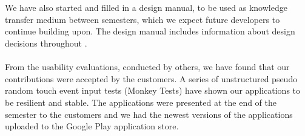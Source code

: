 \\\\
We have also started and filled in a design manual, to be used as knowledge transfer medium between semesters, which we expect future \giraf developers to continue building upon. The design manual includes information about design decisions throughout \giraf.  
\\\\
From the usability evaluations, conducted by others, we have found that our contributions were accepted by the customers. A series of unstructured pseudo random touch event input tests (Monkey Tests) have shown our applications to be resilient and stable. The applications were presented at the end of the semester to the customers and we had the newest versions of the applications uploaded to the Google Play application store. 
